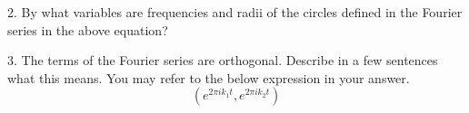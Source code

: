2. By what variables are frequencies and radii of the circles defined in the Fourier series in the above equation?

3. The terms of the Fourier series are orthogonal. Describe in a few sentences what this means. You may refer to the below expression in your answer.
\begin{equation}
    (e^{2 \pi i k_1 t},e^{2 \pi i k_2 t})
\end{equation}
